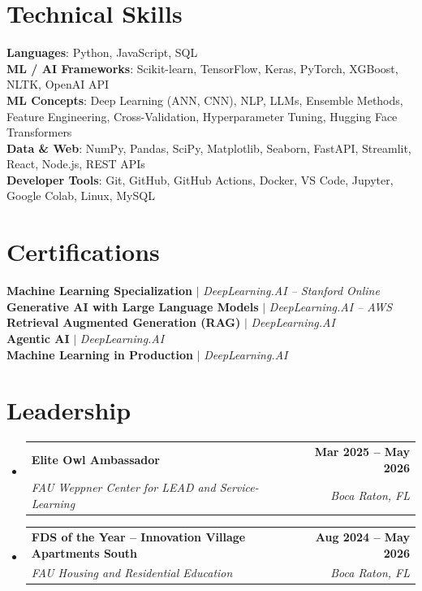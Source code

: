 \documentclass[letterpaper,11pt]{article}
\makeatletter
\newcommand{\resumeSubheading}[4]{
  \vspace{-2pt}\item
    \begin{tabular*}{1.0\textwidth}[t]{l@{\extracolsep{\fill}}r}
      \textbf{#1} & \textbf{\small #2} \\
      \textit{\small#3} & \textit{\small #4} \\
    \end{tabular*}\vspace{-7pt}
}
\newcommand{\resumeSubHeadingListStart}{\begin{itemize}[leftmargin=0.0in, label={}]}
\newcommand{\resumeSubHeadingListEnd}{\end{itemize}}
\makeatother
\begin{document}
\section{Technical Skills}
 \begin{itemize}[leftmargin=0.15in, label={}]
    \small{\item{
     \textbf{Languages}{: Python, JavaScript, SQL} \\
     \textbf{ML / AI Frameworks}{: Scikit-learn, TensorFlow, Keras, PyTorch, XGBoost, NLTK, OpenAI API} \\
     \textbf{ML Concepts}{: Deep Learning (ANN, CNN), NLP, LLMs, Ensemble Methods, Feature Engineering, Cross-Validation, Hyperparameter Tuning, Hugging Face Transformers} \\
     \textbf{Data \& Web}{: NumPy, Pandas, SciPy, Matplotlib, Seaborn, FastAPI, Streamlit, React, Node.js, REST APIs} \\
     \textbf{Developer Tools}{: Git, GitHub, GitHub Actions, Docker, VS Code, Jupyter, Google Colab, Linux, MySQL} \\
    }}
 \end{itemize}
 \vspace{-16pt}

\section{Certifications}
    \begin{itemize}[leftmargin=0.15in, label={}]
        \small{\item{
            \textbf{Machine Learning Specialization} $|$ \textit{DeepLearning.AI -- Stanford Online}  \\
            \textbf{Generative AI with Large Language Models} $|$ \textit{DeepLearning.AI -- AWS}  \\
            \textbf{Retrieval Augmented Generation (RAG)} $|$ \textit{DeepLearning.AI}  \\
            \textbf{Agentic AI} $|$ \textit{DeepLearning.AI}  \\
            \textbf{Machine Learning in Production} $|$ \textit{DeepLearning.AI}
        }}
    \end{itemize}

\section{Leadership}
  \resumeSubHeadingListStart
    \resumeSubheading
      {Elite Owl Ambassador}{Mar 2025 -- May 2026}
      {FAU Weppner Center for LEAD and Service-Learning}{Boca Raton, FL}
    \resumeSubheading
      {FDS of the Year -- Innovation Village Apartments South}{Aug 2024 -- May 2026}
      {FAU Housing and Residential Education}{Boca Raton, FL}
  \resumeSubHeadingListEnd
\end{document}
